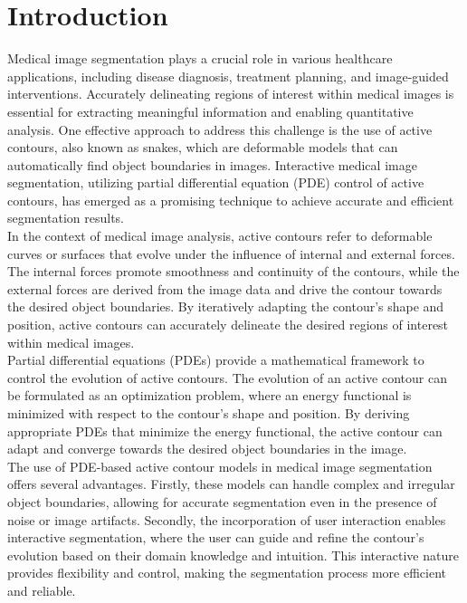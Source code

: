 \documentclass[]{report}
\begin{document}
\chapter*{Introduction}
Medical image segmentation plays a crucial role in various healthcare applications, including disease diagnosis, treatment planning, and image-guided interventions. Accurately delineating regions of interest within medical images is essential for extracting meaningful information and enabling quantitative analysis. One effective approach to address this challenge is the use of active contours, also known as snakes, which are deformable models that can automatically find object boundaries in images. Interactive medical image segmentation, utilizing partial differential equation (PDE) control of active contours, has emerged as a promising technique to achieve accurate and efficient segmentation results.\\

In the context of medical image analysis, active contours refer to deformable curves or surfaces that evolve under the influence of internal and external forces. The internal forces promote smoothness and continuity of the contours, while the external forces are derived from the image data and drive the contour towards the desired object boundaries. By iteratively adapting the contour's shape and position, active contours can accurately delineate the desired regions of interest within medical images.\\

Partial differential equations (PDEs) provide a mathematical framework to control the evolution of active contours. The evolution of an active contour can be formulated as an optimization problem, where an energy functional is minimized with respect to the contour's shape and position. By deriving appropriate PDEs that minimize the energy functional, the active contour can adapt and converge towards the desired object boundaries in the image.\\

The use of PDE-based active contour models in medical image segmentation offers several advantages. Firstly, these models can handle complex and irregular object boundaries, allowing for accurate segmentation even in the presence of noise or image artifacts. Secondly, the incorporation of user interaction enables interactive segmentation, where the user can guide and refine the contour's evolution based on their domain knowledge and intuition. This interactive nature provides flexibility and control, making the segmentation process more efficient and reliable.\\
\end{document}
